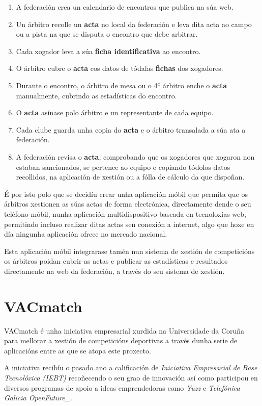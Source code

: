     \begin{enumerate}
     \item A federación crea un calendario de encontros que publica na súa web.
     \item Un árbitro recolle un \textbf{acta} no local da federación e leva dita acta ao 
campo ou a pista na que se disputa o encontro que debe arbitrar.
     \item Cada xogador leva a súa \textbf{ficha identificativa} ao encontro.
     \item O árbitro cubre o \textbf{acta} cos datos de tódalas \textbf{fichas} 
dos xogadores.
     \item Durante o encontro, o árbitro de mesa ou o 4º árbitro enche o \textbf{acta} 
manualmente, cubrindo as estadísticas do encontro.
     \item O \textbf{acta} asínase polo árbitro e un representante de cada equipo.
     \item Cada clube guarda unha copia do \textbf{acta} e o árbitro transalada a súa ata 
a federación.
     \item A federación revisa o \textbf{acta}, comprobando que os xogadores que xogaron 
non estaban sancionados, se pertence ao equipo e copiando tódolos datos recollidos, na 
aplicación de xestión ou a fólla de cálculo da que dispoñan.
    \end{enumerate}
  
  É por isto polo que se decidíu crear unha aplicación móbil que permita que os árbitros 
xestionen as súas actas de forma electrónica, directamente dende o seu teléfono móbil, 
nunha aplicación multidispositivo baseada en tecnoloxías web, permitindo incluso realizar 
ditas actas sen conexión a internet, algo que hoxe en día ningunha aplicación ofrece no 
mercado nacional.

  Esta aplicación móbil integrarase tamén nun sistema de xestión de 
competicións os árbitros poidan cubrir as actas e publicar as estadísticas e 
resultados directamente na web da federación, a través do seu sistema de 
xestión.

    \section{VACmatch}
    VACmatch é unha iniciativa empresarial xurdida na Universidade da Coruña para 
mellorar a xestión de competicións deportivas a través dunha serie de 
aplicacións entre as que se atopa este proxecto.

    A iniciativa recibíu o pasado ano a calificación de \emph{Iniciativa Empresarial de 
Base Tecnolóxica (IEBT)} recoñecendo o seu grao de innovación así como participou en 
diversos programas de apoio a ideas emprendedoras como \emph{Yuzz} e \emph{Telefónica 
Galicia OpenFuture\_}.

